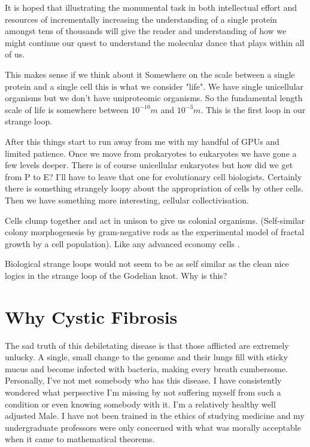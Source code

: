 It is hoped that illustrating the monumental task in both intellectual effort and resources of incrementally increasing the understanding of a single protein amongst tens of thousands will give the reader and understanding of how we might continue our quest to understand the molecular dance that plays within all of us.  
 

This makes sense if we think about it 
Somewhere on the scale between a single protein and a single cell this is what we consider "life". We have single unicellular organisms but we don't have uniproteomic organisms. So the fundamental length scale of life is somewhere between $10^{-10}m$ and $10^{-3}m$. This is the first loop in our strange loop.

After this things start to run away from me with my handful of GPUs and limited patience. Once we move from prokaryotes to eukaryotes we have gone a few levels deeper. There is of course unicellular eukaryotes but how did we get from P to E? I'll have to leave that one for evolutionary cell biologists. Certainly there is something strangely loopy about the appropriation of cells by other cells. Then we have something more interesting, cellular collectivisation.   

Cells clump together and act in unison to give us colonial organisms. (Self-similar colony morphogenesis by gram-negative rods as the experimental model of fractal growth by a cell population). Like any advanced economy cells . 

Biological strange loops would not seem to be as self similar as the clean nice logics in the strange loop of the Godelian knot. Why is this?


\section{Why Cystic Fibrosis}

The sad truth of this debiletating disease is that those afflicted are extremely unlucky. A single, small change to the genome and their lungs fill with sticky mucus and become infected with bacteria, making every breath cumbersome. Personally, I've not met somebody who has this disease. I have consistently wondered what perpsective I'm missing by not suffering myself from such a condition or even knowing somebody with it. I'm a relatively healthy well adjusted Male. I have not been trained in the ethics of studying medicine and my undergraduate professors were only concerned with what was morally acceptable when it came to mathematical theorems.


